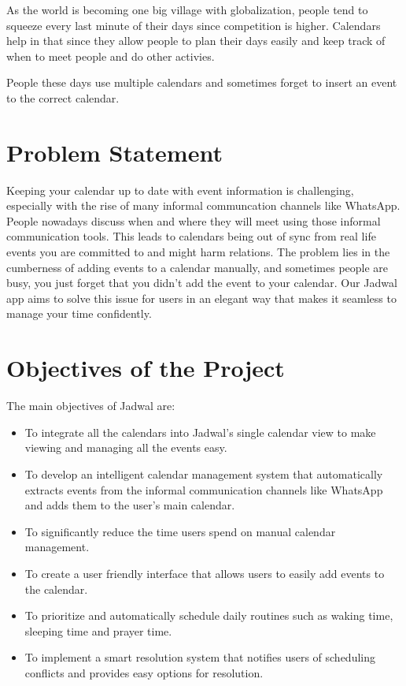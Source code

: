 \documentclass[12pt,a4paper]{report}
\begin{document}
As the world is becoming one big village with globalization, people tend to squeeze every last minute of their days since competition is higher. Calendars help in that since they allow people to plan their days easily and keep track of when to meet people and do other activies.

People these days use multiple calendars and sometimes forget to insert an event to the correct calendar.
\section{Problem Statement}

Keeping your calendar up to date with event information is challenging, especially with the rise of many informal communcation channels like WhatsApp. People nowadays discuss when and where they will meet using those informal communication tools. This leads to calendars being out of sync from real life events you are committed to and might harm relations. The problem lies in the cumberness of adding events to a calendar manually, and sometimes people are busy, you just forget that you didn't add the event to your calendar. Our Jadwal app aims to solve this issue for users in an elegant way that makes it seamless to manage your time confidently.

\section{Objectives of the Project}

The main objectives of Jadwal are:
\begin{itemize}
    
    \item To integrate all the calendars into Jadwal's single calendar view to make viewing and managing all the events easy.
    \item To develop an intelligent calendar management system that automatically extracts events from the informal communication channels like WhatsApp and adds them to the user's main calendar.
    \item To significantly reduce the time users spend on manual calendar management.
    \item To create a user friendly interface that allows users to easily add events to the calendar.
    \item  To prioritize and automatically schedule daily routines such as waking time, sleeping time and prayer time.
    \item To implement a smart resolution system that notifies users of scheduling conflicts and provides easy options for resolution.
\end{itemize}
\end{document}
